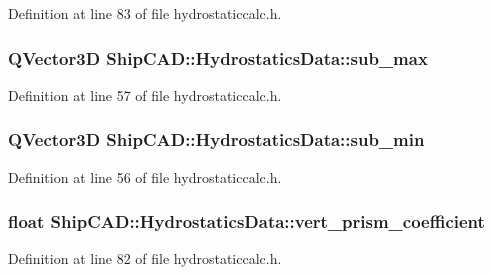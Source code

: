 Definition at line 83 of file hydrostaticcalc.\-h.

\hypertarget{structShipCAD_1_1HydrostaticsData_ab3a6e316a991426c74673025439f123c}{
\subsubsection[{sub\-\_\-max}]{\setlength{\rightskip}{0pt plus 5cm}Q\-Vector3\-D Ship\-C\-A\-D\-::\-Hydrostatics\-Data\-::sub\-\_\-max}}\label{structShipCAD_1_1HydrostaticsData_ab3a6e316a991426c74673025439f123c}


Definition at line 57 of file hydrostaticcalc.\-h.

\hypertarget{structShipCAD_1_1HydrostaticsData_a2d0a1e5f6bf98f8eceb958e5f7e7c73e}{
\subsubsection[{sub\-\_\-min}]{\setlength{\rightskip}{0pt plus 5cm}Q\-Vector3\-D Ship\-C\-A\-D\-::\-Hydrostatics\-Data\-::sub\-\_\-min}}\label{structShipCAD_1_1HydrostaticsData_a2d0a1e5f6bf98f8eceb958e5f7e7c73e}


Definition at line 56 of file hydrostaticcalc.\-h.

\hypertarget{structShipCAD_1_1HydrostaticsData_a2a7fc6a194bc1e78ecce8ab16512d1eb}{
\subsubsection[{vert\-\_\-prism\-\_\-coefficient}]{\setlength{\rightskip}{0pt plus 5cm}float Ship\-C\-A\-D\-::\-Hydrostatics\-Data\-::vert\-\_\-prism\-\_\-coefficient}}\label{structShipCAD_1_1HydrostaticsData_a2a7fc6a194bc1e78ecce8ab16512d1eb}


Definition at line 82 of file hydrostaticcalc.\-h.

